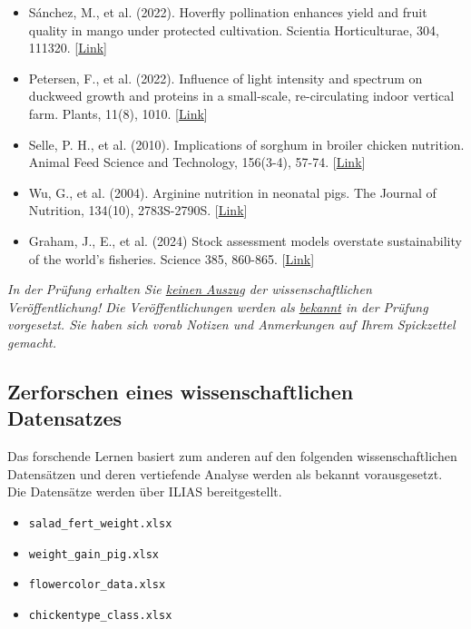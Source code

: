 \documentclass[a4paper, 9pt]{scrartcl}\usepackage[]{graphicx}\usepackage[]{xcolor}
\begin{document}
\begin{itemize}[noitemsep]
\item Sánchez, M., et al. (2022). Hoverfly pollination enhances yield and fruit quality in mango under protected cultivation. Scientia Horticulturae, 304, 111320. [\href{https://www.sciencedirect.com/science/article/pii/S0304423822004411}{Link}]
\item Petersen, F., et al. (2022). Influence of light intensity and spectrum on duckweed growth and proteins in a small-scale, re-circulating indoor vertical farm. Plants, 11(8), 1010. [\href{https://www.mdpi.com/2223-7747/11/8/1010}{Link}]
\item Selle, P. H., et al. (2010). Implications of sorghum in broiler chicken nutrition. Animal Feed Science and Technology, 156(3-4), 57-74. [\href{https://www.sciencedirect.com/science/article/pii/S0377840110000209}{Link}]
\item Wu, G., et al. (2004). Arginine nutrition in neonatal pigs. The Journal of Nutrition, 134(10), 2783S-2790S. [\href{https://www.sciencedirect.com/science/article/pii/S0022316623031279}{Link}]
\item Graham, J., E., et al. (2024) Stock assessment models overstate sustainability of the world’s fisheries. Science 385, 860-865. [\href{https://www.science.org/doi/10.1126/science.adl6282}{Link}]
\end{itemize}

\textit{In der Prüfung erhalten Sie \underline{keinen Auszug} der wissenschaftlichen Veröffentlichung! Die Veröffentlichungen werden als \underline{bekannt} in der Prüfung vorgesetzt. Sie haben sich vorab Notizen und Anmerkungen auf Ihrem Spickzettel gemacht.}

\subsection*{Zerforschen eines wissenschaftlichen Datensatzes}

Das forschende Lernen basiert zum anderen auf den folgenden wissenschaftlichen Datensätzen und deren vertiefende Analyse werden als bekannt vorausgesetzt. Die Datensätze werden über ILIAS bereitgestellt.\\

\begin{itemize}[noitemsep]
\item \texttt{salad\_fert\_weight.xlsx} %
\item \texttt{weight\_gain\_pig.xlsx} %
\item \texttt{flowercolor\_data.xlsx} %
\item \texttt{chickentype\_class.xlsx} %
\end{itemize}
\end{document}
